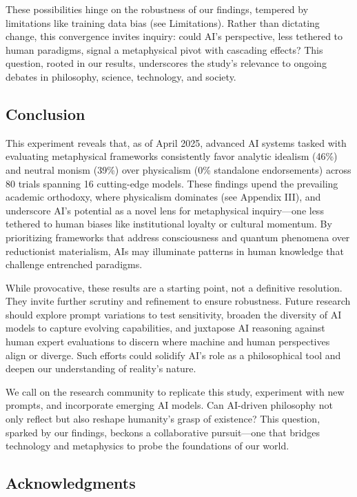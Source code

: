 These possibilities hinge on the robustness of our findings, tempered by
limitations like training data bias (see Limitations). Rather than
dictating change, this convergence invites inquiry: could AI's
perspective, less tethered to human paradigms, signal a metaphysical
pivot with cascading effects? This question, rooted in our results,
underscores the study's relevance to ongoing debates in philosophy,
science, technology, and society.

\subsection{Conclusion}\label{conclusion}

This experiment reveals that, as of April 2025, advanced AI systems
tasked with evaluating metaphysical frameworks consistently favor
analytic idealism (46\%) and neutral monism (39\%) over physicalism (0\%
standalone endorsements) across 80 trials spanning 16 cutting-edge
models. These findings upend the prevailing academic orthodoxy, where
physicalism dominates (see Appendix III), and underscore AI's potential
as a novel lens for metaphysical inquiry---one less tethered to human
biases like institutional loyalty or cultural momentum. By prioritizing
frameworks that address consciousness and quantum phenomena over
reductionist materialism, AIs may illuminate patterns in human knowledge
that challenge entrenched paradigms.

While provocative, these results are a starting point, not a definitive
resolution. They invite further scrutiny and refinement to ensure
robustness. Future research should explore prompt variations to test
sensitivity, broaden the diversity of AI models to capture evolving
capabilities, and juxtapose AI reasoning against human expert
evaluations to discern where machine and human perspectives align or
diverge. Such efforts could solidify AI's role as a philosophical tool
and deepen our understanding of reality's nature.

We call on the research community to replicate this study, experiment
with new prompts, and incorporate emerging AI models. Can AI-driven
philosophy not only reflect but also reshape humanity's grasp of
existence? This question, sparked by our findings, beckons a
collaborative pursuit---one that bridges technology and metaphysics to
probe the foundations of our world.

\subsection{Acknowledgments}\label{acknowledgments}

